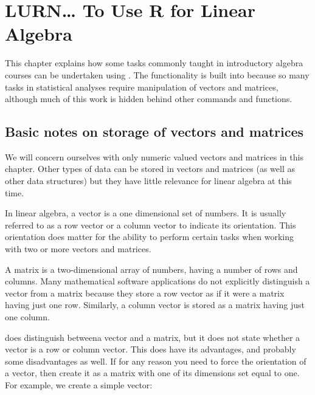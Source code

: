 

 
\chapter{LURN\ldots{} To Use R for Linear Algebra} 
\label{Algebra} 
 



 
This chapter explains how some tasks commonly taught in introductory algebra courses can be undertaken using \R{}. The functionality is built into \R{} because so many tasks in statistical analyses require manipulation of vectors and matrices, although much of this work is hidden behind other commands and functions. 
 
\section{Basic notes on storage of vectors and matrices} 
 
We will concern ourselves with only numeric valued vectors and matrices in this chapter. Other types of data can be stored in vectors and matrices (as well as other data structures) but they have little relevance for linear algebra at this time. 
 
In linear algebra, a vector is a one dimensional set of numbers. It is usually referred to as a row vector or a column vector to indicate its orientation. This orientation does matter for the ability to perform certain tasks when working with two or more vectors and matrices.  
 
A matrix is a two-dimensional array of numbers, having a number of rows and columns. Many mathematical software applications do not explicitly distinguish a vector from a matrix because they store a row vector as if it were a matrix having just one row. Similarly, a column vector is stored as a matrix having just one column. 
 
\R{} does distinguish betweena vector and a matrix, but it does not state whether a vector is a row or column vector. This does have its advantages, and probably some disadvantages as well. If for any reason you need to force the orientation of a vector, then create it as a matrix with one of its dimensions set equal to one. For example, we create a simple vector: 

